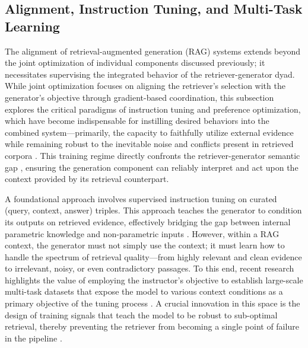 \documentclass[11pt,a4paper]{article}
\begin{document}
\subsection{Alignment, Instruction Tuning, and Multi-Task Learning}


The alignment of retrieval-augmented generation (RAG) systems extends beyond the joint optimization of individual components discussed previously; it necessitates supervising the integrated behavior of the retriever-generator dyad. While joint optimization focuses on aligning the retriever's selection with the generator's objective through gradient-based coordination, this subsection explores the critical paradigms of instruction tuning and preference optimization, which have become indispensable for instilling desired behaviors into the combined system---primarily, the capacity to faithfully utilize external evidence while remaining robust to the inevitable noise and conflicts present in retrieved corpora \cite{arxiv:2312.10997v5}. This training regime directly confronts the retriever-generator semantic gap \cite{arxiv:2507.07030v1}, ensuring the generation component can reliably interpret and act upon the context provided by its retrieval counterpart.

A foundational approach involves supervised instruction tuning on curated (query, context, answer) triples. This approach teaches the generator to condition its outputs on retrieved evidence, effectively bridging the gap between internal parametric knowledge and non-parametric inputs \cite{arxiv:2405.06211v3}. However, within a RAG context, the generator must not simply use the context; it must learn how to handle the spectrum of retrieval quality---from highly relevant and clean evidence to irrelevant, noisy, or even contradictory passages. To this end, recent research highlights the value of employing the instructor's objective to establish large-scale multi-task datasets that expose the model to various context conditions as a primary objective of the tuning process \cite{arxiv:2401.06954v2}. A crucial innovation in this space is the design of training signals that teach the model to be robust to sub-optimal retrieval, thereby preventing the retriever from becoming a single point of failure in the pipeline \cite{arxiv:2506.00054v1}.
\end{document}
